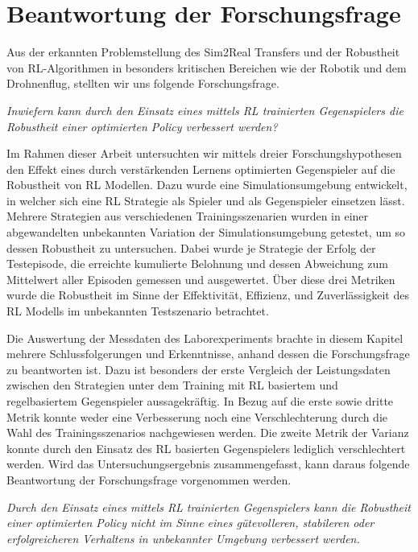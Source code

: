 \section{Beantwortung der Forschungsfrage}

Aus der erkannten Problemstellung des Sim2Real Transfers und der Robustheit von RL-Algorithmen in besonders kritischen Bereichen wie der Robotik und dem Drohnenflug, stellten wir uns folgende Forschungsfrage.

\textit{Inwiefern kann durch den Einsatz eines mittels RL trainierten Gegenspielers die Robustheit einer optimierten Policy verbessert werden?}

Im Rahmen dieser Arbeit untersuchten wir mittels dreier Forschungshypothesen den Effekt eines durch verstärkenden Lernens optimierten Gegenspieler auf die Robustheit von RL Modellen.
Dazu wurde eine Simulationsumgebung entwickelt, in welcher sich eine RL Strategie als Spieler und als Gegenspieler einsetzen lässt.
Mehrere Strategien aus verschiedenen Trainingsszenarien wurden in einer abgewandelten unbekannten Variation der Simulationsumgebung getestet, um so dessen Robustheit zu untersuchen.
Dabei wurde je Strategie der Erfolg der Testepisode, die erreichte kumulierte Belohnung und dessen Abweichung zum Mittelwert aller Episoden gemessen und ausgewertet. 
Über diese drei Metriken wurde die Robustheit im Sinne der Effektivität, Effizienz, und Zuverlässigkeit des RL Modells im unbekannten Testszenario betrachtet.

Die Auswertung der Messdaten des Laborexperiments brachte in diesem Kapitel mehrere Schlussfolgerungen und Erkenntnisse, anhand dessen die Forschungsfrage zu beantworten ist.
Dazu ist besonders der erste Vergleich der Leistungsdaten zwischen den Strategien unter dem Training mit RL basiertem und regelbasiertem Gegenspieler aussagekräftig.
In Bezug auf die erste sowie dritte Metrik konnte weder eine Verbesserung noch eine Verschlechterung durch die Wahl des Trainingsszenarios nachgewiesen werden.
Die zweite Metrik der Varianz konnte durch den Einsatz des RL basierten Gegenspielers lediglich verschlechtert werden.
Wird das Untersuchungsergebnis zusammengefasst, kann daraus folgende Beantwortung der Forschungsfrage vorgenommen werden.

\textit{Durch den Einsatz eines mittels RL trainierten Gegenspielers kann die Robustheit einer optimierten Policy nicht im Sinne eines gütevolleren, stabileren oder erfolgreicheren Verhaltens in unbekannter Umgebung verbessert werden.}

